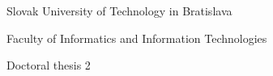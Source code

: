 \begin{center}
\thispagestyle{empty}
{\large Slovak University of Technology in Bratislava}
\par\end{center}{\large \par}

\begin{center}
{\large Faculty of Informatics and Information Technologies}
\par\end{center}{\large \par}

\begin{center}
{\large \myInstitute}
\end{center}


\vfill{}

\begin{center}
\textbf{\Large \myName}
\par\end{center}{\Large \par}

\medskip{}

\begin{spacing}{2.0}
\begin{center}
\textbf{\LARGE \myTitle }
\par\end{center}{\huge \par}
\end{spacing}

\medskip{}


\begin{center}

{\Large Doctoral thesis 2}
\par\end{center}{\Large \par}

\smallskip{}
\begin{center}
\large\myEvidenceNumber
\par\end{center}

\vfill{}